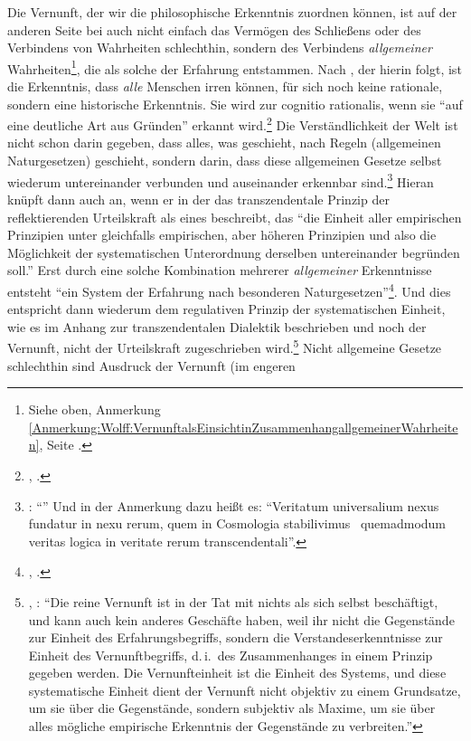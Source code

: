 Die Vernunft, der wir die philosophische Erkenntnis zuordnen können, ist auf der
anderen Seite bei  auch nicht einfach das Vermögen des Schließens oder des
Verbindens von Wahrheiten schlechthin, sondern des Verbindens
\emph{allgemeiner} Wahrheiten\footnote{Siehe oben, Anmerkung
\ref{Anmerkung:Wolff:VernunftalsEinsichtinZusammenhangallgemeinerWahrheiten},
Seite
\pageref{Anmerkung:Wolff:VernunftalsEinsichtinZusammenhangallgemeinerWahrheiten}.},
die als solche der Erfahrung entstammen. Nach
, der hierin  folgt,
ist die Erkenntnis, dass \emph{alle} Menschen irren können, für sich noch keine
rationale, sondern eine historische Erkenntnis. Sie wird zur cognitio
rationalis, wenn sie \enquote{auf eine deutliche Art aus Gründen} erkannt
wird.\footnote{\Cite[][\S~17]{Meier:AuszugausderVernunftlehre1752},
\cite[][XVI: 93.17--18]{Kant:GesammelteWerke1900ff.}.} Die Verständlichkeit der
Welt ist nicht schon darin gegeben, dass alles, was geschieht, nach Regeln (allgemeinen Naturgesetzen) geschieht, sondern darin, dass diese allgemeinen
Gesetze selbst wiederum untereinander verbunden und auseinander erkennbar
sind.\footnote{\cite[Vgl.][\S~482]{Wolff:Psychologiaempirica1968}:
\enquote{} Und in der Anmerkung
dazu heißt es: \enquote{Veritatum universalium nexus fundatur in nexu rerum, quem in
Cosmologia stabilivimus \punkt\ quemadmodum veritas logica in veritate rerum
transcendentali}.} Hieran knüpft dann auch  an, wenn er in der  das transzendentale Prinzip der reflektierenden Urteilskraft als
eines beschreibt, das \enquote{die Einheit aller empirischen Prinzipien unter
gleichfalls empirischen, aber höheren Prinzipien und also die Möglichkeit der
systematischen Unterordnung derselben untereinander begründen soll.} Erst durch
eine solche Kombination mehrerer \emph{allgemeiner} Erkenntnisse entsteht
\enquote{ein System der Erfahrung nach besonderen
Naturgesetzen}\footnote{\cite[][B xxvii]{Kant:KritikderUrteilskraft2009},
\cite[][V: 180.8--11, 24--25]{Kant:GesammelteWerke1900ff.}.}. Und dies
entspricht dann wiederum dem regulativen Prinzip der systematischen Einheit, wie
es im Anhang zur transzendentalen Dialektik beschrieben und noch der Vernunft,
nicht der Urteilskraft zugeschrieben wird.\footnote{\cite[Vgl.][B
708]{Kant:KritikderreinenVernunft2003}, \cite[][III:
448.22--30]{Kant:GesammelteWerke1900ff.}: \enquote{Die reine Vernunft ist in der
Tat mit nichts als sich selbst beschäftigt, und kann auch kein anderes Geschäfte haben, weil ihr nicht
die Gegenstände zur Einheit des Erfahrungsbegriffs, sondern die
Verstandeserkenntnisse zur Einheit des Vernunftbegriffs, d.\,i.\ des
Zusammenhanges in einem Prinzip gegeben werden. Die Vernunfteinheit ist die
Einheit des Systems, und diese systematische Einheit dient der Vernunft nicht
objektiv zu einem Grundsatze, um sie über die Gegenstände, sondern subjektiv als
Maxime, um sie über alles mögliche empirische Erkenntnis der Gegenstände zu
verbreiten.}} Nicht allgemeine Gesetze schlechthin sind Ausdruck der Vernunft (im engeren
